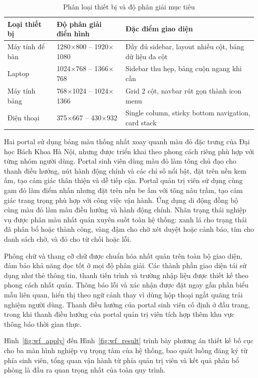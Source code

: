 \documentclass[../DoAn.tex]{subfiles}
\begin{document}
\begin{table}[H]
\centering
\caption{Phân loại thiết bị và độ phân giải mục tiêu}
\label{tab:device_targets}
\small
\begin{tabular}{|p{2.6cm}|p{4.4cm}|p{5.6cm}|}
\hline
\textbf{Loại thiết bị} & \textbf{Độ phân giải điển hình} & \textbf{Đặc điểm giao diện} \\
\hline
Máy tính để bàn & 1280$\times$800 -- 1920$\times$1080 & Đầy đủ sidebar, layout nhiều cột, bảng dữ liệu đa cột \\
\hline
Laptop & 1024$\times$768 -- 1366$\times$768 & Sidebar thu hẹp, bảng cuộn ngang khi cần \\
\hline
Máy tính bảng & 768$\times$1024 -- 1024$\times$1366 & Grid 2 cột, navbar rút gọn thành icon menu \\
\hline
Điện thoại & 375$\times$667 -- 430$\times$932 & Single column, sticky bottom navigation, card stack \\
\hline
\end{tabular}
\end{table}

Hai portal sử dụng bảng màu thống nhất xoay quanh màu đỏ đặc trưng của Đại
học Bách Khoa Hà Nội, nhưng được triển khai theo phong cách riêng phù hợp với
từng nhóm người dùng. Portal sinh viên dùng màu đỏ làm tông chủ đạo cho thanh
điều hướng, nút hành động chính và các chỉ số nổi bật, đặt trên nền kem ấm,
tạo cảm giác thân thiện và dễ tiếp cận. Portal quản trị viên sử dụng cùng gam
đỏ làm điểm nhấn nhưng đặt trên nền be ấm với tông nâu trầm, tạo cảm giác
trang trọng phù hợp với công việc vận hành. Ứng dụng di động đồng bộ cùng màu
đỏ làm màu điều hướng và hành động chính. Nhãn trạng thái nghiệp vụ được phân
màu nhất quán xuyên suốt toàn hệ thống: xanh lá cho trạng thái đã phân bổ
hoặc thành công, vàng đậm cho chờ xét duyệt hoặc cảnh báo, tím cho danh sách
chờ, và đỏ cho từ chối hoặc lỗi.

Phông chữ và thang cỡ chữ được chuẩn hóa nhất quán trên toàn bộ giao diện,
đảm bảo khả năng đọc tốt ở mọi độ phân giải. Các thành phần giao diện tái
sử dụng như thẻ thông tin, thanh tiến trình và trường nhập liệu được thiết kế
theo phong cách nhất quán. Thông báo lỗi và xác nhận được đặt ngay gần phần
biểu mẫu liên quan, hiển thị theo ngữ cảnh thay vì dùng hộp thoại ngắt quãng
trải nghiệm người dùng. Thanh điều hướng của portal sinh viên cố định ở đầu
trang, trong khi thanh điều hướng của portal quản trị viên tích hợp thêm khu
vực thông báo thời gian thực.

Hình~\ref{fig:wf_apply} đến Hình~\ref{fig:wf_result} trình bày phương án thiết
kế bố cục cho ba màn hình nghiệp vụ trọng tâm của hệ thống, bao quát luồng đăng
ký từ phía sinh viên, tổng quan vận hành từ phía quản trị viên và kết quả phân
bổ phòng là đầu ra quan trọng nhất của toàn quy trình.
\end{document}

